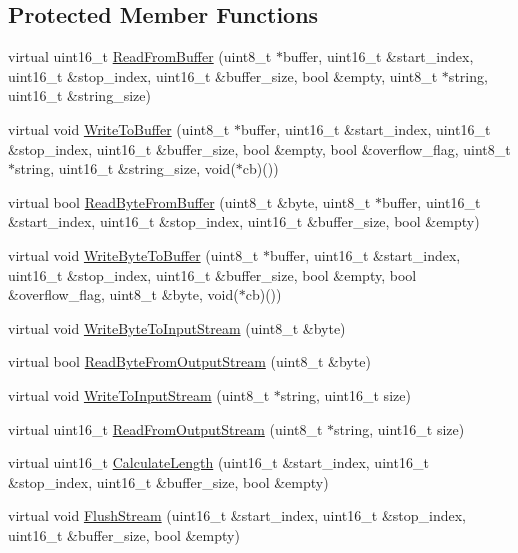 \subsection*{Protected Member Functions}
\begin{DoxyCompactItemize}
\item 
virtual uint16\+\_\+t \hyperlink{class_stream_a752930f620aed4a3a80b243ce66e57ca}{Read\+From\+Buffer} (uint8\+\_\+t $\ast$buffer, uint16\+\_\+t \&start\+\_\+index, uint16\+\_\+t \&stop\+\_\+index, uint16\+\_\+t \&buffer\+\_\+size, bool \&empty, uint8\+\_\+t $\ast$string, uint16\+\_\+t \&string\+\_\+size)
\item 
virtual void \hyperlink{class_stream_ad4444f4f2a111a304bb0e25efc3a2cb2}{Write\+To\+Buffer} (uint8\+\_\+t $\ast$buffer, uint16\+\_\+t \&start\+\_\+index, uint16\+\_\+t \&stop\+\_\+index, uint16\+\_\+t \&buffer\+\_\+size, bool \&empty, bool \&overflow\+\_\+flag, uint8\+\_\+t $\ast$string, uint16\+\_\+t \&string\+\_\+size, void($\ast$cb)())
\item 
virtual bool \hyperlink{class_stream_a32e449304f65b5571fe848a503fc9d68}{Read\+Byte\+From\+Buffer} (uint8\+\_\+t \&byte, uint8\+\_\+t $\ast$buffer, uint16\+\_\+t \&start\+\_\+index, uint16\+\_\+t \&stop\+\_\+index, uint16\+\_\+t \&buffer\+\_\+size, bool \&empty)
\item 
virtual void \hyperlink{class_stream_a0da4122369b2e625c8e4a224cc598a04}{Write\+Byte\+To\+Buffer} (uint8\+\_\+t $\ast$buffer, uint16\+\_\+t \&start\+\_\+index, uint16\+\_\+t \&stop\+\_\+index, uint16\+\_\+t \&buffer\+\_\+size, bool \&empty, bool \&overflow\+\_\+flag, uint8\+\_\+t \&byte, void($\ast$cb)())
\item 
virtual void \hyperlink{class_stream_a0784d377cc92ddde7cc730be17a1a3aa}{Write\+Byte\+To\+Input\+Stream} (uint8\+\_\+t \&byte)
\item 
virtual bool \hyperlink{class_stream_a3f8e3c5513c6b8605c0fed74a3ed22bc}{Read\+Byte\+From\+Output\+Stream} (uint8\+\_\+t \&byte)
\item 
virtual void \hyperlink{class_stream_aa2f020721d273ce821ccf626e5eb773c}{Write\+To\+Input\+Stream} (uint8\+\_\+t $\ast$string, uint16\+\_\+t size)
\item 
virtual uint16\+\_\+t \hyperlink{class_stream_ab458be72cc54330f518f5ab35ab84106}{Read\+From\+Output\+Stream} (uint8\+\_\+t $\ast$string, uint16\+\_\+t size)
\item 
virtual uint16\+\_\+t \hyperlink{class_stream_a8047b62e7dcfe0e50210b3e40c7aa6eb}{Calculate\+Length} (uint16\+\_\+t \&start\+\_\+index, uint16\+\_\+t \&stop\+\_\+index, uint16\+\_\+t \&buffer\+\_\+size, bool \&empty)
\item 
virtual void \hyperlink{class_stream_a435b1b065846d3b24969cfc6dacabc6b}{Flush\+Stream} (uint16\+\_\+t \&start\+\_\+index, uint16\+\_\+t \&stop\+\_\+index, uint16\+\_\+t \&buffer\+\_\+size, bool \&empty)
\end{DoxyCompactItemize}
